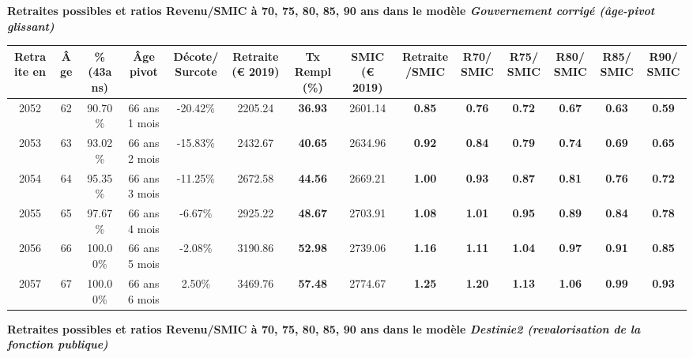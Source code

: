  \vspace{0.1cm} 
{\bf \noindent Retraites possibles et ratios Revenu/SMIC à 70, 75, 80, 85, 90 ans dans le modèle \emph{Gouvernement corrigé (âge-pivot glissant)}}  
 
\begin{adjustbox}{max width=\textwidth} 
\begin{tabular}[htb]{|c|c||c|c|c||c|c||c|c||c|c|c|c|c|} 
\hline 
 Retraite en &  Âge &  \%(43ans) &  Âge pivot &  Décote/Surcote &  Retraite (\euro{} 2019) &  Tx Rempl(\%) &  SMIC (\euro{} 2019) &  Retraite/SMIC &  R70/SMIC &  R75/SMIC &  R80/SMIC &  R85/SMIC &  R90/SMIC \\ 
\hline \hline 
 2052 &  62 &  90.70\% &  66 ans 1 mois &  -20.42\% &  2205.24 &  {\bf 36.93} &  2601.14 &  {\bf {\color{red} 0.85}} &  {\bf {\color{red} 0.76}} &  {\bf {\color{red} 0.72}} &  {\bf {\color{red} 0.67}} &  {\bf {\color{red} 0.63}} &  {\bf {\color{red} 0.59}} \\ 
\hline 
 2053 &  63 &  93.02\% &  66 ans 2 mois &  -15.83\% &  2432.67 &  {\bf 40.65} &  2634.96 &  {\bf {\color{red} 0.92}} &  {\bf {\color{red} 0.84}} &  {\bf {\color{red} 0.79}} &  {\bf {\color{red} 0.74}} &  {\bf {\color{red} 0.69}} &  {\bf {\color{red} 0.65}} \\ 
\hline 
 2054 &  64 &  95.35\% &  66 ans 3 mois &  -11.25\% &  2672.58 &  {\bf 44.56} &  2669.21 &  {\bf 1.00} &  {\bf {\color{red} 0.93}} &  {\bf {\color{red} 0.87}} &  {\bf {\color{red} 0.81}} &  {\bf {\color{red} 0.76}} &  {\bf {\color{red} 0.72}} \\ 
\hline 
 2055 &  65 &  97.67\% &  66 ans 4 mois &  -6.67\% &  2925.22 &  {\bf 48.67} &  2703.91 &  {\bf 1.08} &  {\bf 1.01} &  {\bf {\color{red} 0.95}} &  {\bf {\color{red} 0.89}} &  {\bf {\color{red} 0.84}} &  {\bf {\color{red} 0.78}} \\ 
\hline 
 2056 &  66 &  100.00\% &  66 ans 5 mois &  -2.08\% &  3190.86 &  {\bf 52.98} &  2739.06 &  {\bf 1.16} &  {\bf 1.11} &  {\bf 1.04} &  {\bf {\color{red} 0.97}} &  {\bf {\color{red} 0.91}} &  {\bf {\color{red} 0.85}} \\ 
\hline 
 2057 &  67 &  100.00\% &  66 ans 6 mois &  2.50\% &  3469.76 &  {\bf 57.48} &  2774.67 &  {\bf 1.25} &  {\bf 1.20} &  {\bf 1.13} &  {\bf 1.06} &  {\bf {\color{red} 0.99}} &  {\bf {\color{red} 0.93}} \\ 
\hline 
\hline 
\end{tabular} 
\end{adjustbox} 
 
 \vspace{0.1cm} 
{\bf \noindent Retraites possibles et ratios Revenu/SMIC à 70, 75, 80, 85, 90 ans dans le modèle \emph{Destinie2 (revalorisation de la fonction publique)}}  
 
